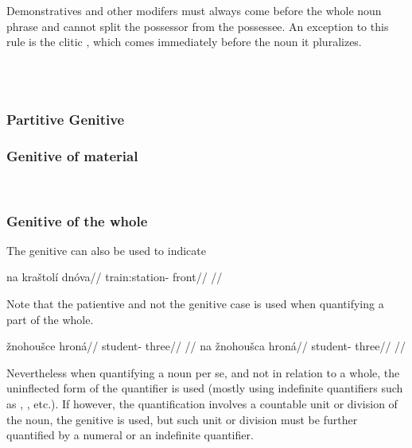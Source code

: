 Demonstratives and other modifers must always come before
the whole noun phrase and cannot split the possessor from the possessee. An
exception to this rule is the clitic , which comes immediately before
the noun it pluralizes.

\pex
\a  {}\\
\a  {}\\
\xe

\subsubsection{Partitive Genitive}

\subsubsection{Genitive of material}

\ex
{}\\
\irdp{}{}
\xe

\subsubsection{Genitive of the whole}
The genitive can also be used to indicate

\pex
\begingl
\gla na kraštolí dnóva//
\glb \Loc{} train:station-\Gen{} front//
\glft {}//
\endgl
\xe

Note that the patientive and not the genitive case is used when quantifying a part of the whole.

\pex
\a
\begingl
\gla *žnohoušce hroná//
\glb student-\Gen{} three//
\glft {}//
\endgl
\a
\begingl
\gla na žnohoušca hroná//
\glb \Loc{} student-\Gen{} three//
\glft {}//
\endgl
\xe

Nevertheless when quantifying a noun per se, and not in relation to a whole, the uninflected form of the quantifier is used (mostly using indefinite quantifiers such as , , etc.). If however, the quantification involves a countable unit or division of the noun, the genitive is used, but such unit or division must be further quantified by a numeral or an indefinite quantifier.

